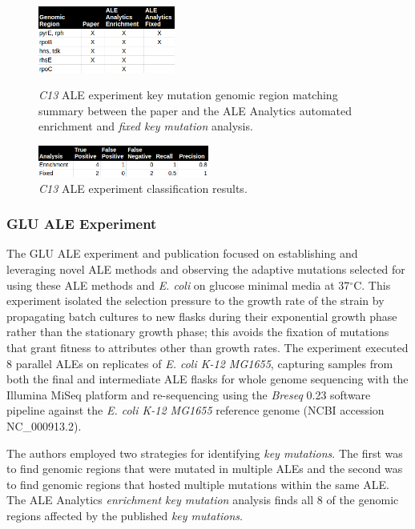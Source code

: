 \documentclass[12pt,final,masters,chapterheads]{ucsd}  %
\begin{document}
\begin{figure}[H]
  \caption{\textit{C13} ALE experiment {key mutation} genomic region matching summary between the paper and the ALE Analytics automated {enrichment} and \textit{fixed key mutation} analysis.}
  \centering
  \includegraphics[width=0.4\textwidth]{c13_key_mutation_regions.png}
  \label{fig:}
\end{figure}

\begin{figure}[H]
  \centering
   \caption{\textit{C13} ALE experiment classification results.}
  \includegraphics[width=0.5\textwidth]{c13_precision_recall.png}
\end{figure}
\subsubsection{GLU ALE Experiment}
%
%
The GLU ALE experiment and publication focused on establishing and leveraging novel ALE methods and observing the adaptive mutations selected for using these ALE methods and \textit{E. coli} on glucose minimal media at 37$^{\circ}$C. This experiment isolated the selection pressure to the growth rate of the strain by propagating batch cultures to new flasks during their exponential growth phase rather than the stationary growth phase; this avoids the fixation of mutations that grant fitness to attributes other than growth rates. The experiment executed 8 parallel ALEs on replicates of \textit{E. coli K-12 MG1655}, capturing samples from both the final and intermediate ALE flasks for whole genome sequencing with the Illumina MiSeq platform and re-sequencing using the \textit{Breseq} 0.23 software pipeline against the \textit{E. coli K-12 MG1655} reference genome (NCBI accession NC\_000913.2).

The authors employed two strategies for identifying \textit{key mutations}. The first was to find genomic regions that were mutated in multiple ALEs and the second was to find genomic regions that hosted multiple mutations within the same ALE. The ALE Analytics \textit{enrichment key mutation} analysis finds all 8 of the genomic regions affected by the published \textit{key mutations}.
\end{document}
